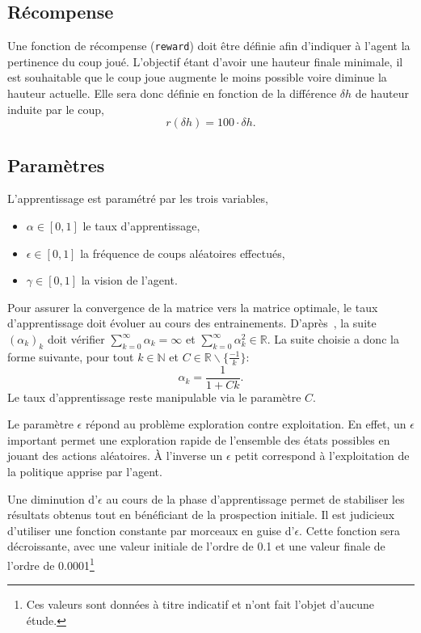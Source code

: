 \documentclass{report}
\newcommand{\R}{\mathbb{R}}
\begin{document}
\subsection{Récompense}
Une fonction de récompense (\texttt{reward}) doit être définie afin d'indiquer
à l'agent la
pertinence du coup joué. L'objectif étant d'avoir une hauteur finale minimale,
il est souhaitable que le coup joue augmente le moins possible voire diminue la
hauteur actuelle. Elle sera donc définie en fonction de la différence \(\delta
h\) de hauteur induite par le coup,
\[
  r(\delta h) = 100\cdot \delta h.
\]

\subsection{Paramètres}
L'apprentissage est paramétré par les trois variables,
\begin{itemize}
  \item \(\alpha \in [0, 1]\) le taux d'apprentissage,
  \item \(\epsilon \in [0, 1]\) la fréquence de coups aléatoires effectués,
  \item \(\gamma \in [0, 1]\) la vision de l'agent.
\end{itemize}
Pour assurer la convergence de la matrice vers la matrice optimale,
le taux d'apprentissage doit évoluer au cours des entrainements.
D'après~\cite{watkins92}, la suite \( (\alpha_k)_k \) doit vérifier
\( \sum_{k=0}^\infty \alpha_k = \infty \) et \(
\sum_{k=0}^\infty \alpha_k^2 \in \R \). La suite choisie a donc la forme
suivante, pour tout \( k \in \mathbb{N} \) et
\( C \in \R \backslash \{ \frac{-1}{k} \} \):
\[
  \alpha_k = \frac{1}{1 + Ck}.
\]
Le taux d'apprentissage reste manipulable via le paramètre \( C \).



Le paramètre \(\epsilon\) répond au problème exploration contre exploitation. En
effet, un \(\epsilon\) important permet une exploration rapide de l'ensemble
des états possibles en jouant des actions aléatoires. À l'inverse un \(\epsilon\)
petit correspond à l'exploitation de la politique apprise par l'agent.

Une diminution d'\(\epsilon\) au cours de la phase d'apprentissage permet de
stabiliser les résultats obtenus tout en bénéficiant de la prospection initiale.
Il est judicieux d'utiliser une fonction constante par
morceaux en guise d'\(\epsilon\). Cette fonction sera décroissante, avec une
valeur initiale de l'ordre de 0.1 et une valeur finale de l'ordre de
0.0001\footnote{Ces valeurs sont données à titre indicatif et n'ont fait l'objet
d'aucune étude.}
\end{document}
